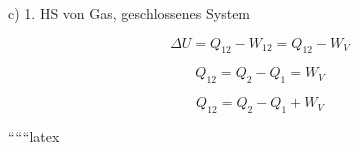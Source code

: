 c) 1. HS von Gas, geschlossenes System

\[
\Delta U = Q_{12} - W_{12} = Q_{12} - W_V
\]

\[
Q_{12} = Q_2 - Q_1 = W_V
\]

\[
Q_{12} = Q_2 - Q_1 + W_V
\]

``````latex